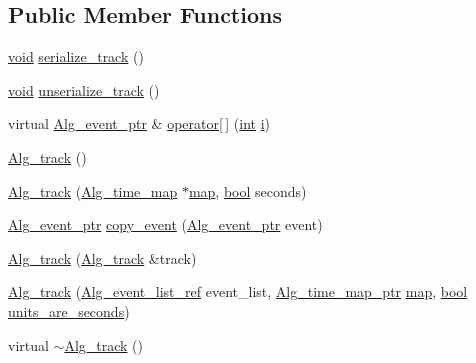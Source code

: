 \subsection*{Public Member Functions}
\begin{DoxyCompactItemize}
\item 
\hyperlink{sound_8c_ae35f5844602719cf66324f4de2a658b3}{void} \hyperlink{class_alg__track_ac4483408924557666b4ff43f324c6853}{serialize\+\_\+track} ()
\item 
\hyperlink{sound_8c_ae35f5844602719cf66324f4de2a658b3}{void} \hyperlink{class_alg__track_aa2a22255bdcc49422242a0bcfdedd1d4}{unserialize\+\_\+track} ()
\item 
virtual \hyperlink{allegro_8h_aeb8db009b4ffadef2e7ca0e4936f0307}{Alg\+\_\+event\+\_\+ptr} \& \hyperlink{class_alg__track_afdf64e764112617977583953270bbfb3}{operator\mbox{[}$\,$\mbox{]}} (\hyperlink{xmltok_8h_a5a0d4a5641ce434f1d23533f2b2e6653}{int} \hyperlink{checksum_8c_ab80e330a3bc9e38c1297fe17381e92b4}{i})
\item 
\hyperlink{class_alg__track_aa454d55dd539a7510360ce08eb8a67fc}{Alg\+\_\+track} ()
\item 
\hyperlink{class_alg__track_ab598c899c4284c2495452090690aa108}{Alg\+\_\+track} (\hyperlink{class_alg__time__map}{Alg\+\_\+time\+\_\+map} $\ast$\hyperlink{structmap}{map}, \hyperlink{mac_2config_2i386_2lib-src_2libsoxr_2soxr-config_8h_abb452686968e48b67397da5f97445f5b}{bool} seconds)
\item 
\hyperlink{allegro_8h_aeb8db009b4ffadef2e7ca0e4936f0307}{Alg\+\_\+event\+\_\+ptr} \hyperlink{class_alg__track_a5f208821c72d61f1091844f26bb8b801}{copy\+\_\+event} (\hyperlink{allegro_8h_aeb8db009b4ffadef2e7ca0e4936f0307}{Alg\+\_\+event\+\_\+ptr} event)
\item 
\hyperlink{class_alg__track_ae5045740b19c2271d4d112f7c2ad3fc7}{Alg\+\_\+track} (\hyperlink{class_alg__track}{Alg\+\_\+track} \&track)
\item 
\hyperlink{class_alg__track_ad1c8a6685ef7ce9d5db8bfac2abd367a}{Alg\+\_\+track} (\hyperlink{allegro_8h_aaa2ce1b9ed080a40cfdfe48726935bff}{Alg\+\_\+event\+\_\+list\+\_\+ref} event\+\_\+list, \hyperlink{allegro_8h_a1a64b329a53ae040ef015de7ffd640dd}{Alg\+\_\+time\+\_\+map\+\_\+ptr} \hyperlink{structmap}{map}, \hyperlink{mac_2config_2i386_2lib-src_2libsoxr_2soxr-config_8h_abb452686968e48b67397da5f97445f5b}{bool} \hyperlink{class_alg__track_a0e6a77b346f4e48af674cd9a647f9e7f}{units\+\_\+are\+\_\+seconds})
\item 
virtual \hyperlink{class_alg__track_aa4373e01fd0e541209c768f77caeb7a5}{$\sim$\+Alg\+\_\+track} ()

\end{DoxyCompactItemize}
